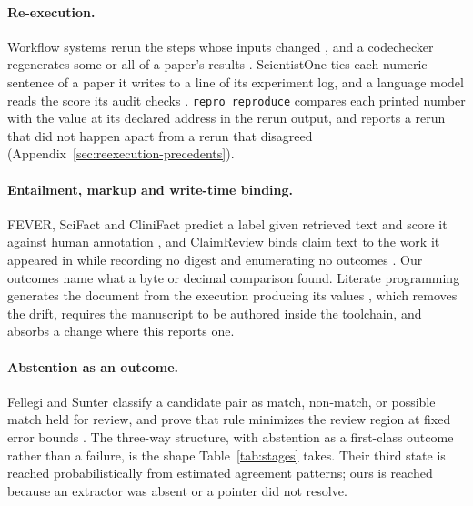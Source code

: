 \documentclass{article}
\newcommand{\code}[1]{\texttt{#1}}
\begin{document}
\paragraph{Re-execution.} Workflow systems rerun the steps whose inputs changed
\citep{iterative2020dvc,koster2012snakemake}, and a codechecker regenerates some or
all of a paper's results \citep{nust2021codecheck}.
ScientistOne ties each numeric sentence of a paper it writes to a line of its experiment log, and
a language model reads the score its audit checks \citep{meng2026scientistone}.
\code{repro reproduce} compares each printed number with the value at its declared address in the
rerun output, and reports a rerun that did not happen apart from a rerun that disagreed
(Appendix~\ref{sec:reexecution-precedents}).

\paragraph{Entailment, markup and write-time binding.} FEVER, SciFact and CliniFact predict a
label given retrieved text and score it against human annotation
\citep{thorne2018fever,wadden2020scifact,clinifact2025}, and ClaimReview binds claim text to the
work it appeared in while recording no digest and enumerating no outcomes
\citep{schemaorg2026claimreview}. Our outcomes name what a byte or decimal comparison found.
Literate programming generates the document from the execution producing its values
\citep{leisch2002sweave}, which removes the drift, requires the manuscript to be authored inside
the toolchain, and absorbs a change where this reports one.

\paragraph{Abstention as an outcome.} Fellegi and Sunter classify a candidate pair as match,
non-match, or possible match held for review, and prove that rule minimizes the review region at
fixed error bounds \citep{fellegi1969linkage}. The three-way structure, with abstention as a
first-class outcome rather than a failure, is the shape Table~\ref{tab:stages} takes. Their third
state is reached probabilistically from estimated agreement patterns; ours is reached because an
extractor was absent or a pointer did not resolve.
\end{document}
